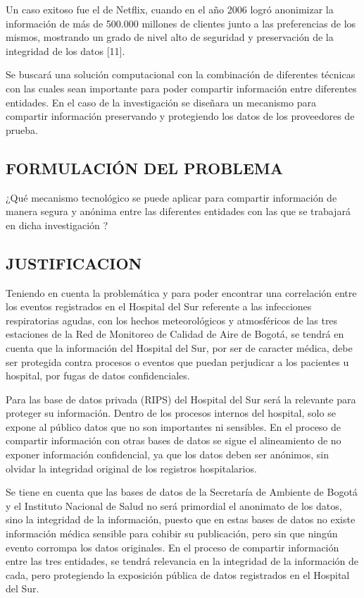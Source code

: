 \documentclass[a4paper, 12pt, oneside]{article}
\theoremstyle{definition}
\theoremstyle{remark}
\begin{document}
Un caso exitoso fue el de Netflix, cuando en el año 2006 logró anonimizar la información de más de 500.000 millones de clientes junto a las preferencias de los mismos, mostrando un grado de nivel alto de seguridad y preservación de la integridad de los datos [11].

Se buscará una solución computacional con la combinación de diferentes técnicas con las cuales sean importante  para poder compartir información entre diferentes entidades. En el caso de la investigación se diseñara un mecanismo para compartir información preservando y protegiendo los datos de los proveedores de prueba. 

\subsection{FORMULACIÓN DEL PROBLEMA}

¿Qué mecanismo tecnológico se puede aplicar para compartir información de manera segura y anónima entre las diferentes entidades con las que se trabajará en dicha investigación ?

\subsection{JUSTIFICACION}

Teniendo en cuenta la problemática y para  poder encontrar una correlación entre los eventos registrados en el Hospital del Sur referente a las infecciones respiratorias agudas, con los hechos meteorológicos y atmosféricos de las tres estaciones de la Red de Monitoreo de Calidad de Aire de Bogotá, se tendrá en cuenta que la información del Hospital del Sur, por ser de caracter médica, debe ser protegida contra procesos o eventos que puedan perjudicar a los pacientes u hospital, por fugas de datos confidenciales. 

Para las base de datos privada (RIPS) del Hospital del Sur será la relevante para proteger su información. Dentro de los procesos internos del hospital, solo se expone al público datos que no son importantes ni sensibles. En el proceso de compartir información con otras bases de datos se sigue el alineamiento de no exponer información confidencial, ya que los datos deben ser anónimos, sin olvidar la integridad original de los registros hospitalarios.

Se tiene en cuenta que las bases de datos de la Secretaría de Ambiente de Bogotá y el Instituto Nacional de Salud no será primordial el anonimato de los datos, sino la integridad de la información, puesto que en estas bases de datos no existe información médica sensible para cohibir su publicación, pero sin que ningún evento corrompa los datos originales. En el proceso de compartir información entre las tres entidades, se tendrá relevancia en la integridad de la información de cada, pero protegiendo la exposición pública de datos registrados en el Hospital del Sur.
\end{document}
